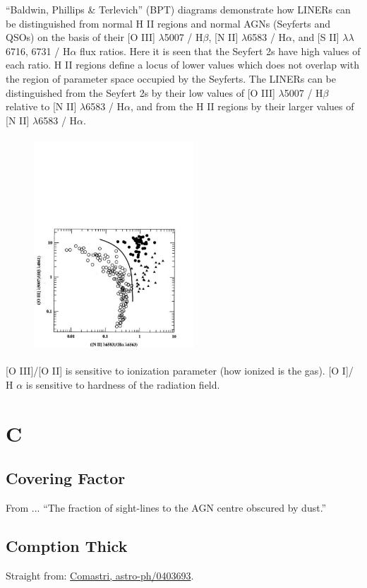 \documentclass[11pt]{article}
\begin{document}
    ``Baldwin, Phillips \& Terlevich'' (BPT) diagrams demonstrate how LINERs can be distinguished from normal H II regions and normal AGNs (Seyferts and QSOs) on the basis of their [O III] $\lambda$5007 / H$\beta$, [N II] $\lambda$6583 / H$\alpha$, and [S II] $\lambda \lambda$6716, 6731 / H$\alpha$ flux ratios. Here it is seen that the Seyfert 2s have high values of each ratio. H II regions define a locus of lower values which does not overlap with the region of parameter space occupied by the Seyferts. The LINERs can be distinguished from the Seyfert 2s by their low values of [O III] $\lambda$5007 / H$\beta$ relative to [N II] $\lambda$6583 / H$\alpha$, and from the H II regions by their larger values of [N II] $\lambda$6583 / H$\alpha$. 

    \begin{figure}
      \includegraphics[height=8.0cm,width=6.0cm]
      {BPT.pdf}
      \caption[]{}
    \end{figure}
    [O III]/[O II] is sensitive to ionization parameter (how ionized is the gas).
    [O I]/ H $\alpha$ is sensitive to hardness of the radiation field. 
    
    
\section{C}

    \subsection{Covering Factor}
    From \citet[e.g.,][]{Roseboom13}...
``The fraction of sight-lines to the AGN centre obscured by dust.''

    \subsection{Comption Thick}
    Straight from: \href{http://ned.ipac.caltech.edu/level5/March04/Comastri/frames.html}{Comastri,  astro-ph/0403693}.
    
\end{document}
